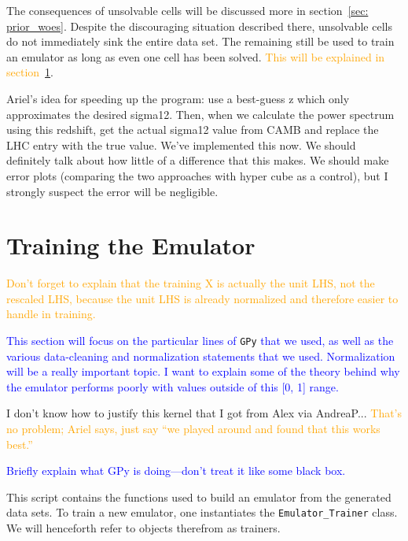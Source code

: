 The consequences of unsolvable cells will be discussed more in
section~\ref{sec: prior_woes}. Despite the discouraging situation described 
there,
unsolvable cells do not immediately sink the entire data set. The remaining
still be used to train an emulator as long as even one cell has been solved.
\textcolor{orange}{This will be explained in section~\ref{sec: train_emu}}.


Ariel’s idea for speeding up the program: use a best-guess z which only approximates the desired sigma12. Then, when we calculate the power spectrum using this redshift, get the actual sigma12 value from CAMB and replace the LHC entry with the true value.
We’ve implemented this now. We should definitely talk about how little of a difference that this makes. We should make error plots (comparing the two approaches with hyper cube as a control), but I strongly suspect the error will be negligible.


\section{Training the Emulator}
\label{sec: train_emu}

\textcolor{orange}{Don't forget to explain that the training X is actually the
unit LHS, not the rescaled LHS, because the unit LHS is already normalized
and therefore easier to handle in training.}


\textcolor{blue}{This section will focus on the particular lines of}
\verb|GPy| \textcolor{blue}{that we used, as well
as the various data-cleaning and normalization statements that we used.
Normalization will be a really important topic. I want to explain some of
the theory behind why the emulator performs poorly with values outside of this
[0, 1] range.}

I don't know how to justify this kernel that I got from Alex via AndreaP...
\textcolor{orange}{That's no problem; Ariel says, just say ``we played around
and found that this works best.''}

\textcolor{blue}{Briefly explain what GPy is doing—don’t treat it like some black box.}

This script contains the functions used to build an emulator from the 
generated data sets. To train a new emulator, one instantiates the
\verb|Emulator_Trainer| class. We will henceforth refer to objects therefrom 
as trainers.

